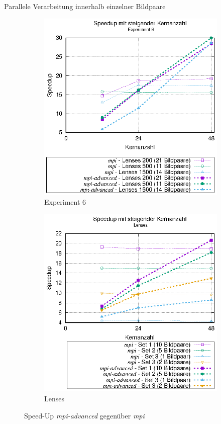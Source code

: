 \begin{frame}{Parallele Verarbeitung innerhalb einzelner Bildpaare}
	\begin{figure}[h]
		\begin{subfigure}[b]{0.47\textwidth}
			\centering
			\includegraphics[width=\textwidth]{pdf/mpi_advanced_speedup_exp6}
			\caption{Experiment 6}
		\end{subfigure}
		\hfill
		\begin{subfigure}[b]{0.47\textwidth}
			\centering
			\includegraphics[width=\textwidth]{pdf/mpi_advanced_speedup_lenses}
			\caption{Lenses}
		\end{subfigure}
		\caption{Speed-Up \textit{mpi-advanced} gegenüber \textit{mpi}}
	\end{figure}
\end{frame}

